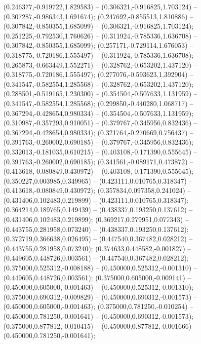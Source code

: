  (0.246377,-0.919722,1.829583) -- (0.306321,-0.916825,1.703124) -- (0.307287,-0.986343,1.691674);
 (0.247692,-0.855513,1.810886) -- (0.307842,-0.850355,1.685099) -- (0.306321,-0.916825,1.703124);
 (0.251225,-0.792530,1.760626) -- (0.311924,-0.785336,1.636708) -- (0.307842,-0.850355,1.685099);
 (0.257171,-0.729114,1.676053) -- (0.318775,-0.720186,1.555497) -- (0.311924,-0.785336,1.636708);
 (0.265873,-0.663449,1.552271) -- (0.328762,-0.653202,1.437120) -- (0.318775,-0.720186,1.555497);
 (0.277076,-0.593623,1.392904) -- (0.341547,-0.582554,1.285568) -- (0.328762,-0.653202,1.437120);
 (0.288501,-0.519165,1.230300) -- (0.354504,-0.507633,1.131959) -- (0.341547,-0.582554,1.285568);
 (0.299850,-0.440280,1.068717) -- (0.367294,-0.428654,0.980334) -- (0.354504,-0.507633,1.131959);
 (0.310987,-0.357293,0.910051) -- (0.379767,-0.345956,0.832436) -- (0.367294,-0.428654,0.980334);
 (0.321764,-0.270669,0.756437) -- (0.391763,-0.260002,0.690185) -- (0.379767,-0.345956,0.832436);
 (0.332013,-0.181035,0.610215) -- (0.403108,-0.171390,0.555645) -- (0.391763,-0.260002,0.690185);
 (0.341561,-0.089171,0.473872) -- (0.413618,-0.080849,0.430972) -- (0.403108,-0.171390,0.555645);
 (0.350227,0.003985,0.349965) -- (0.423111,0.010765,0.318347) -- (0.413618,-0.080849,0.430972);
 (0.357834,0.097358,0.241024) -- (0.431406,0.102483,0.219899) -- (0.423111,0.010765,0.318347);
 (0.364214,0.189765,0.149439) -- (0.438337,0.193250,0.137612) -- (0.431406,0.102483,0.219899);
 (0.369217,0.279951,0.077343) -- (0.443755,0.281958,0.073240) -- (0.438337,0.193250,0.137612);
 (0.372719,0.366638,0.026495) -- (0.447540,0.367482,0.028212) -- (0.443755,0.281958,0.073240);
 (0.374633,0.448582,-0.001827) -- (0.449605,0.448726,0.003561) -- (0.447540,0.367482,0.028212);
 (0.375000,0.525312,-0.008188) -- (0.450000,0.525312,-0.001310) -- (0.449605,0.448726,0.003561);
 (0.375000,0.605000,-0.009141) -- (0.450000,0.605000,-0.001463) -- (0.450000,0.525312,-0.001310);
 (0.375000,0.690312,-0.009829) -- (0.450000,0.690312,-0.001573) -- (0.450000,0.605000,-0.001463);
 (0.375000,0.781250,-0.010254) -- (0.450000,0.781250,-0.001641) -- (0.450000,0.690312,-0.001573);
 (0.375000,0.877812,-0.010415) -- (0.450000,0.877812,-0.001666) -- (0.450000,0.781250,-0.001641);
